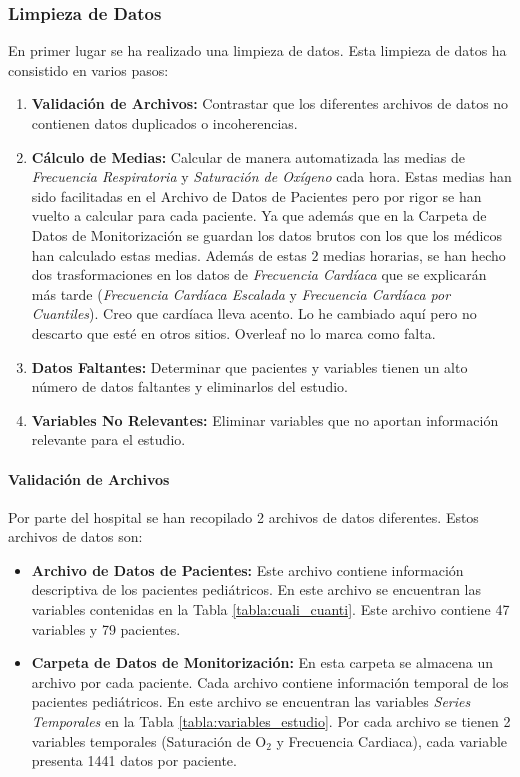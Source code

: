 \subsubsection{Limpieza de Datos}\label{sec:limpieza_datos}

En primer lugar se ha realizado una limpieza de datos. Esta limpieza de datos ha consistido en varios pasos: 

\begin{enumerate}
    \item \textbf{Validación de Archivos:} Contrastar que los diferentes archivos de datos no contienen datos duplicados o incoherencias.
    \item \textbf{Cálculo de Medias:} Calcular de manera automatizada las medias de \textit{Frecuencia Respiratoria} y \textit{Saturación de Oxígeno} cada hora. Estas medias han sido facilitadas en el Archivo de Datos de Pacientes pero por rigor se han vuelto a calcular para cada paciente. Ya que además que en la Carpeta de Datos de Monitorización se guardan los datos brutos con los que los médicos han calculado estas medias. Además de estas $2$ medias horarias, se han hecho dos trasformaciones en los datos de \textit{Frecuencia Cardíaca} que se explicarán más tarde (\textit{Frecuencia Cardíaca Escalada} y \textit{Frecuencia Cardíaca por Cuantiles}).{\color{blue} Creo que cardíaca lleva acento. Lo he cambiado aquí pero no descarto que esté en otros sitios. Overleaf no lo marca como falta.}
    \item \textbf{Datos Faltantes:} Determinar que pacientes y variables tienen un alto número de datos faltantes y eliminarlos del estudio.
    \item \textbf{Variables No Relevantes:} Eliminar variables que no aportan información relevante para el estudio.
\end{enumerate}



\paragraph{Validación de Archivos}

 
Por parte del hospital se han recopilado 2 archivos de datos diferentes. Estos archivos de datos son:

\begin{itemize}
    \item \textbf{Archivo de Datos de Pacientes:} Este archivo contiene información descriptiva de los pacientes pediátricos. En este archivo se encuentran las variables contenidas en la Tabla \ref{tabla:cuali_cuanti}. Este archivo contiene 47 variables y 79 pacientes.
    \item \textbf{Carpeta de Datos de Monitorización:} En esta carpeta se almacena un archivo por cada paciente. Cada archivo contiene información temporal de los pacientes pediátricos. En este archivo se encuentran las variables \textit{Series Temporales} en la Tabla \ref{tabla:variables_estudio}. Por cada archivo se tienen 2 variables temporales (Saturación de O$_2$ y Frecuencia Cardiaca), cada variable presenta 1441 datos por paciente.
\end{itemize}

